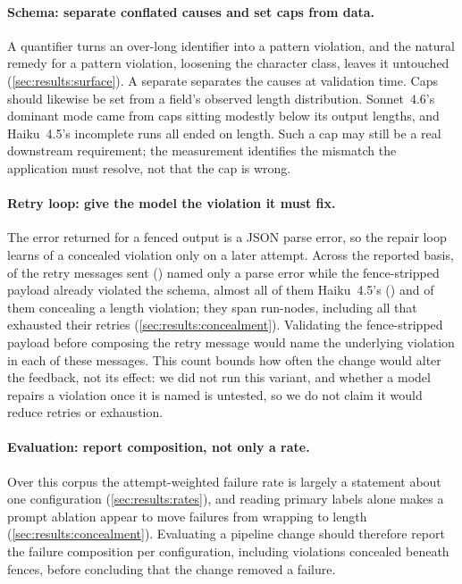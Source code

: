 \paragraph{Schema: separate conflated causes and set caps from data.}
A  quantifier turns an over-long identifier into a pattern
violation, and the natural remedy for a pattern violation, loosening the
character class, leaves it untouched (\cref{sec:results:surface}). A
separate  separates the causes at validation time.
Caps should likewise be set from a field's observed length distribution.
Sonnet~4.6's dominant mode came from caps sitting modestly below its
output lengths, and Haiku~4.5's incomplete runs all ended on length. Such
a cap may still be a real downstream requirement; the measurement
identifies the mismatch the application must resolve, not that the cap
is wrong.

\paragraph{Retry loop: give the model the violation it must fix.}
The error returned for a fenced output is a JSON parse error, so the
repair loop learns of a concealed violation only on a later attempt.
Across the reported basis,  of the
 retry messages sent
() named only a parse error while the
fence-stripped payload already violated the schema, almost all of them
Haiku~4.5's () and
 of them concealing a length violation; they
span  run-nodes, including all
 that exhausted their retries
(\cref{sec:results:concealment}). Validating the fence-stripped payload
before composing the retry message would name the underlying violation
in each of these messages. This count bounds how often the change would
alter the feedback, not its effect: we did not run this variant, and
whether a model repairs a violation once it is named is untested, so we
do not claim it would reduce retries or exhaustion.

\paragraph{Evaluation: report composition, not only a rate.}
Over this corpus the attempt-weighted failure rate is largely a statement
about one configuration (\cref{sec:results:rates}), and reading primary
labels alone makes a prompt ablation appear to move failures from
wrapping to length (\cref{sec:results:concealment}). Evaluating a
pipeline change should therefore report the failure composition per
configuration, including violations concealed beneath fences, before
concluding that the change removed a failure.

